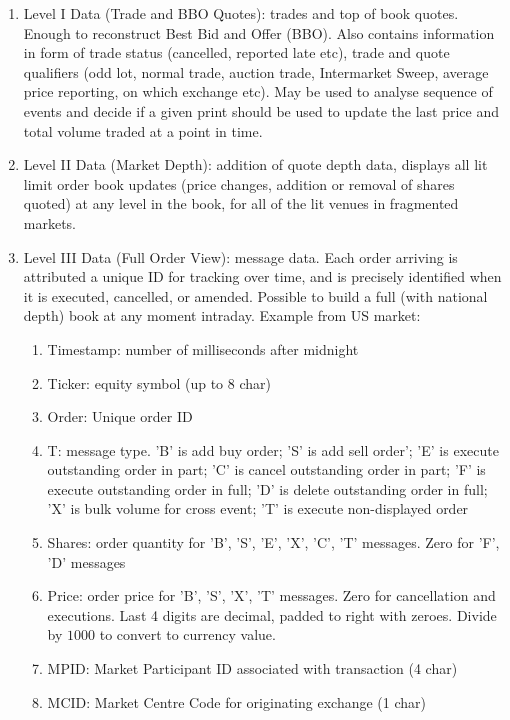 \begin{definition} 
\begin{enumerate}[label=\roman*.]
\setlength{\itemsep}{0pt}
\item Level I Data (Trade and BBO Quotes): trades and top of book quotes. Enough to reconstruct Best Bid and Offer (BBO). Also contains information in form of trade status (cancelled, reported late etc), trade and quote qualifiers (odd lot, normal trade, auction trade, Intermarket Sweep, average price reporting, on which exchange etc). May be used to analyse sequence of events and decide if a given print should be used to update the last price and total volume traded at a point in time.
\item Level II Data (Market Depth): addition of quote depth data, displays all lit limit order book updates (price changes, addition or removal of shares quoted) at any level in the book, for all of the lit venues in fragmented markets.
\item Level III Data (Full Order View): message data. Each order arriving is attributed a unique ID for tracking over time, and is precisely identified when it is executed, cancelled, or amended. Possible to build a full (with national depth) book at any moment intraday. Example from US market:
\begin{enumerate}[label=\arabic*.]
\setlength{\itemsep}{0pt}
\item Timestamp: number of milliseconds after midnight
\item Ticker: equity symbol (up to 8 char)
\item Order: Unique order ID
\item T: message type. 'B' is add buy order; 'S' is add sell order'; 'E' is execute outstanding order in part; 'C' is cancel outstanding order in part; 'F' is execute outstanding order in full; 'D' is delete outstanding order in full; 'X' is bulk volume for cross event; 'T' is execute non-displayed order
\item Shares: order quantity for 'B', 'S', 'E', 'X', 'C', 'T' messages. Zero for 'F', 'D' messages
\item Price: order price for 'B', 'S', 'X', 'T' messages. Zero for cancellation and executions. Last 4 digits are decimal, padded to right with zeroes. Divide by $1000$ to convert to currency value.
\item MPID: Market Participant ID associated with transaction (4 char)
\item MCID: Market Centre Code for originating exchange (1 char)

\end{enumerate}
\end{enumerate}
\end{definition}
